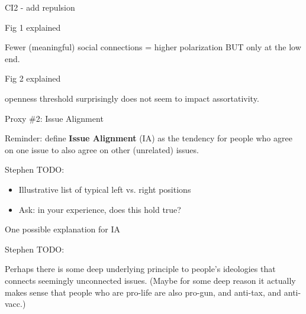 \documentclass[12pt]{beamer}
\begin{document}
\begin{frame}[c]{CI2 - add repulsion}  %




\end{frame}

\begin{frame}[c]{Fig 1 explained}  %

Fewer (meaningful) social connections = higher polarization BUT only at the low
end.

\end{frame}

\begin{frame}[c]{Fig 2 explained}  %


openness threshold surprisingly does not seem to impact assortativity.

\end{frame}

\begin{frame}[c]{Proxy \#2: Issue Alignment} %

Reminder: define \textbf{Issue Alignment} (IA) as the tendency for people who agree on
one issue to also agree on other (unrelated) issues.

{\tiny \color{red} 
Stephen TODO:

\begin{itemize}
\itemsep.1em
\item Illustrative list of typical left vs. right positions
\item Ask: in your experience, does this hold true?
\end{itemize}
}

\end{frame}
\begin{frame}[c]{One possible explanation for IA} %

{\tiny \color{red} 
Stephen TODO:

Perhaps there is some deep underlying principle to people's ideologies that
connects seemingly unconnected issues. (Maybe for some deep reason it actually
makes sense that people who are pro-life are also pro-gun, and anti-tax, and
anti-vacc.)
}

\end{frame}
\end{document}
